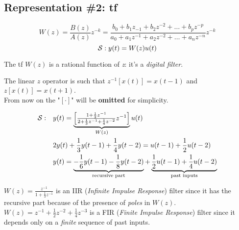 \usetikzlibrary{arrows}
\subsection{Representation \#2: \acrfull{tf}}

\[
    W(z) = \frac{B(z)}{A(z)} z^{-k} = \frac{b_0 + b_1z_{-1} + b_2z^{-2} + \ldots + b_pz^{-p}}{a_0 + a_1z^{-1} + a_2z^{-2} + \ldots + a_nz^{-n}} z^{-k} 
\]
\vspace{1pt}
\[
     \mathcal{S}: y(t) = W(z)u(t)
\]     

The \gls{tf} $W(z)$ is a rational function of \emph{z}: it's a \emph{digital filter}.\\

\begin{remark}[$z$ operator]
    The linear $z$ operator is such that $z^{-1}[x(t)]=x(t-1)$ and $z[x(t)]=x(t+1)$.\\
    From now on the "$[\cdot]$" will be \textbf{omitted} for simplicity.
\end{remark}


\begin{example}
    \begin{align*}
    \mathcal{S}: \quad
        & y(t) = \underbrace{\begin{bmatrix}
            \frac{1+\frac{1}{2}z^{-1}}{2+\frac{1}{3}z^{-1}+\frac{1}{4}z^{-2}} z^{-1}
        \end{bmatrix}}_{W(z)} u(t) \\
        & 2y(t) + \frac{1}{3}y(t-1) + \frac{1}{4}y(t-2) = u(t-1) + \frac{1}{2}u(t-2) \\
        & y(t) = \underbrace{-\frac{1}{6}y(t-1) - \frac{1}{8}y(t-2)}_\text{recursive part} + \underbrace{\frac{1}{2}u(t-1) + \frac{1}{4}u(t-2)}_\text{past inputs}
    \end{align*}

\end{example}
\begin{remark}
\hfill \break 
    $\displaystyle W(z) = \frac{z^{-1}}{1 + \frac{1}{3}z^{-1}}$ is an IIR (\emph{Infinite Impulse Response}) filter since it has the recursive part because of the presence of \emph{poles} in $W(z)$.\\
    $\displaystyle W(z) = z^{-1} + \frac{1}{2}z^{-2} + \frac{1}{4}z^{-3}$ is a FIR (\emph{Finite Impulse Response}) filter since it depends only on a \emph{finite} sequence of past inputs.
\end{remark}

